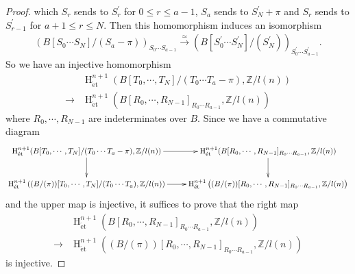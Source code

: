 \documentclass{article}
\newcommand{\et}{\mathrm{\acute{e}t}}
\newcommand{\HO}{\operatorname{H}}
\begin{document}
\begin{proof}
%
which $S_{r}$ sends to $S^{\prime}_{r}$ for $0\leq r\leq a-1$,
$S_{a}$ sends to $S^{\prime}_{N}+\pi$ and 
$S_{r}$ sends to $S^{\prime}_{r-1}$ for $a+1\leq r\leq N$.
Then this homomorphism induces an isomorphism
%
\begin{align*}
\left(
B[S_{0}\cdots S_{N}]
/(S_{a}-\pi)
\right)_{S_{0}\cdots S_{a-1}}
\xrightarrow{\simeq}
\left(
B[S^{\prime}_{0}\cdots S^{\prime}_{N}]
/(S^{\prime}_{N})
\right)_{S^{\prime}_{0}\cdots S^{\prime}_{a-1}}.
\end{align*}
%
So we have an injective homomorphism
%
\begin{align*}
&\HO^{n+1}_{\et}\left(
B[T_{0}, \cdots, T_{N}]/(T_{0}\cdots T_{a}-\pi),
\mathbb{Z}/l(n)
\right)  \\
\to
&\HO^{n+1}_{\et}\left(
B[R_{0}, \cdots, R_{N-1}]_{R_{0}\cdots R_{a-1}},
\mathbb{Z}/l(n)
\right)
\end{align*}
%
where $R_{0}, \cdots, R_{N-1}$ are indeterminates over $B$.
Since we have a commutative diagram
%
\footnotesize
\begin{equation*}
\xymatrix{
\HO^{n+1}_{\et}(
B[T_{0}, \cdots, T_{N}]/(T_{0}\cdots T_{a}-\pi),
\mathbb{Z}/l(n)
)
\ar[r]\ar[d]
&
\HO^{n+1}_{\et}(
B[R_{0}, \cdots, R_{N-1}]_{R_{0}\cdots R_{a-1}},
\mathbb{Z}/l(n)
)
\ar[d]
\\
\HO^{n+1}_{\et}\left(
(B/(\pi))[T_{0}, \cdots, T_{N}]/(T_{0}\cdots T_{a}),
\mathbb{Z}/l(n)
\right)
\ar[r]
&
\HO^{n+1}_{\et}\left(
(B/(\pi))[R_{0}, \cdots, R_{N-1}]_{R_{0}\cdots R_{a-1}},
\mathbb{Z}/l(n)
\right)
}    
\end{equation*}
\normalsize
%
and the upper map is injective, it suffices to prove that the right map
%
\begin{align}\label{intcet}
&\HO^{n+1}_{\et}\left(
B[R_{0}, \cdots, R_{N-1}]_{R_{0}\cdots R_{a-1}},
\mathbb{Z}/l(n)
\right)  \nonumber \\
\to
&\HO^{n+1}_{\et}\left(
(B/(\pi))[R_{0}, \cdots, R_{N-1}]_{R_{0}\cdots R_{a-1}},
\mathbb{Z}/l(n)
\right)
\end{align}
%
is injective.


\end{proof}
\end{document}
